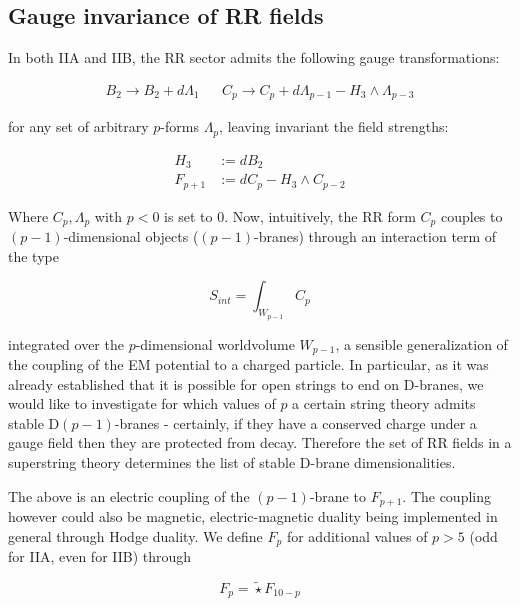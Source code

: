 \subsection{Gauge invariance of RR fields}

In both IIA and IIB, the RR sector admits the following gauge transformations:

\begin{align}
B_2 \rightarrow B_2 + d\Lambda_1 && C_p \rightarrow C_p + d\Lambda_{p-1} - H_3 \wedge \Lambda_{p-3}
\end{align}

for any set of arbitrary $p$-forms $\Lambda_p$, leaving invariant the field strengths:

\begin{equation}
\begin{aligned}
H_3 &:= dB_2 \\
F_{p+1} &:= dC_p - H_3 \wedge C_{p-2} \label{fieldstrengths}
\end{aligned}
\end{equation}

Where $C_{p}, \Lambda_p$ with $p<0$ is set to $0$. Now, intuitively, the RR form $C_p$ couples to $(p-1)$-dimensional objects ($(p-1)$-branes) through an interaction term of the type

\begin{equation}
	S_{int} = \int_{W_{p-1}} C_p
	\label{}
\end{equation}

integrated over the $p$-dimensional worldvolume $W_{p-1}$, a sensible generalization of the coupling of the EM potential to a charged particle. In particular, as it was already established that it is possible for open strings to end on D-branes, we would like to investigate for which values of $p$ a certain string theory admits stable D$(p-1)$-branes - certainly, if they have a conserved charge under a gauge field then they are protected from decay. Therefore the set of RR fields in a superstring theory determines the list of stable D-brane dimensionalities.

The above is an electric coupling of the $(p-1)$-brane to $F_{p+1}$. The coupling however could also be magnetic, electric-magnetic duality being implemented in general through Hodge duality. We define $F_p$ for additional values of $p > 5$ (odd for IIA, even for IIB) through

\begin{equation}
F_{p} = \widetilde\star F_{10-p}
\end{equation}

